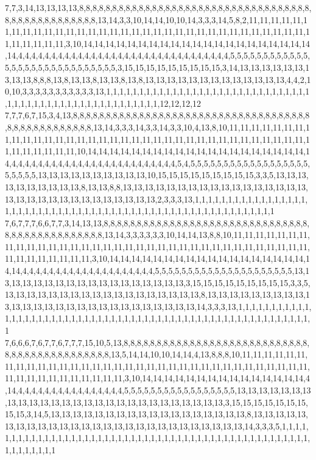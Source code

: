 7,7,3,14,13,13,13,13,8,8,8,8,8,8,8,8,8,8,8,8,8,8,8,8,8,8,8,8,8,8,8,8,8,8,8,8,8,8,8,8,8,8,8,8,8,8,8,8,8,8,8,8,8,8,8,8,8,13,14,3,3,10,14,14,10,10,14,3,3,3,14,5,8,2,11,11,11,11,11,11,11,11,11,11,11,11,11,11,11,11,11,11,11,11,11,11,11,11,11,11,11,11,11,11,11,11,11,11,11,11,11,11,11,3,10,14,14,14,14,14,14,14,14,14,14,14,14,14,14,14,14,14,14,14,14,14,14,4,4,4,4,4,4,4,4,4,4,4,4,4,4,4,4,4,4,4,4,4,4,4,4,4,4,4,4,4,4,4,4,5,5,5,5,5,5,5,5,5,5,5,5,5,5,5,5,5,5,5,5,5,5,5,5,5,5,5,5,5,3,15,15,15,15,15,15,15,15,15,3,14,13,13,13,13,13,13,13,13,13,8,8,8,13,8,13,13,8,13,13,8,13,8,13,13,13,13,13,13,13,13,13,13,13,13,13,4,4,2,10,10,3,3,3,3,3,3,3,3,3,3,3,13,1,1,1,1,1,1,1,1,1,1,1,1,1,1,1,1,1,1,1,1,1,1,1,1,1,1,1,1,1,1,1,1,1,1,1,1,1,1,1,1,1,1,1,1,1,1,1,1,1,1,1,1,1,1,12,12,12,12
7,7,7,6,7,15,3,4,13,8,8,8,8,8,8,8,8,8,8,8,8,8,8,8,8,8,8,8,8,8,8,8,8,8,8,8,8,8,8,8,8,8,8,8,8,8,8,8,8,8,8,8,8,8,8,8,8,8,13,14,3,3,3,14,3,3,14,3,3,10,4,13,8,10,11,11,11,11,11,11,11,11,11,11,11,11,11,11,11,11,11,11,11,11,11,11,11,11,11,11,11,11,11,11,11,11,11,11,11,11,11,11,11,11,11,11,10,14,14,14,14,14,14,14,14,14,14,14,14,14,14,14,14,14,14,14,14,14,4,4,4,4,4,4,4,4,4,4,4,4,4,4,4,4,4,4,4,4,4,4,4,4,4,5,4,5,5,5,5,5,5,5,5,5,5,5,5,5,5,5,5,5,5,5,5,5,5,5,13,13,13,13,13,13,13,13,13,13,10,15,15,15,15,15,15,15,15,15,3,3,5,13,13,13,13,13,13,13,13,13,13,8,13,13,8,8,13,13,13,13,13,13,13,13,13,13,13,13,13,13,13,13,13,13,13,13,13,13,13,13,13,13,13,13,13,13,13,2,3,3,3,13,1,1,1,1,1,1,1,1,1,1,1,1,1,1,1,1,1,1,1,1,1,1,1,1,1,1,1,1,1,1,1,1,1,1,1,1,1,1,1,1,1,1,1,1,1,1,1,1,1,1,1,1,1,1,1,1,1,1
7,6,7,7,7,6,6,7,7,3,14,13,13,8,8,8,8,8,8,8,8,8,8,8,8,8,8,8,8,8,8,8,8,8,8,8,8,8,8,8,8,8,8,8,8,8,8,8,8,8,8,8,8,8,8,8,8,8,8,13,14,3,3,3,3,3,3,10,14,14,13,8,8,10,11,11,11,11,11,11,11,11,11,11,11,11,11,11,11,11,11,11,11,11,11,11,11,11,11,11,11,11,11,11,11,11,11,11,11,11,11,11,11,11,11,11,11,3,10,14,14,14,14,14,14,14,14,14,14,14,14,14,14,14,14,14,14,14,14,4,4,4,4,4,4,4,4,4,4,4,4,4,4,4,4,4,4,4,4,5,5,5,5,5,5,5,5,5,5,5,5,5,5,5,5,5,5,5,5,5,13,13,13,13,13,13,13,13,13,13,13,13,13,13,13,13,13,13,3,15,15,15,15,15,15,15,15,15,3,3,5,13,13,13,13,13,13,13,13,13,13,13,13,13,13,13,13,13,13,8,13,13,13,13,13,13,13,13,13,13,13,13,13,13,13,13,13,13,13,13,13,13,13,13,13,13,13,14,3,3,3,13,1,1,1,1,1,1,1,1,1,1,1,1,1,1,1,1,1,1,1,1,1,1,1,1,1,1,1,1,1,1,1,1,1,1,1,1,1,1,1,1,1,1,1,1,1,1,1,1,1,1,1,1,1,1,1,1,1,1
7,6,6,6,7,6,7,7,6,7,7,7,15,10,5,13,8,8,8,8,8,8,8,8,8,8,8,8,8,8,8,8,8,8,8,8,8,8,8,8,8,8,8,8,8,8,8,8,8,8,8,8,8,8,8,8,8,8,8,8,13,5,14,14,10,10,14,14,4,13,8,8,8,10,11,11,11,11,11,11,11,11,11,11,11,11,11,11,11,11,11,11,11,11,11,11,11,11,11,11,11,11,11,11,11,11,11,11,11,11,11,11,11,11,11,11,11,11,11,3,10,14,14,14,14,14,14,14,14,14,14,14,14,14,14,14,4,14,4,4,4,4,4,4,4,4,4,4,4,4,4,4,4,4,5,5,5,5,5,5,5,5,5,5,5,5,5,5,5,5,5,13,13,13,13,13,13,13,13,13,13,13,13,13,13,13,13,13,13,13,13,13,13,13,13,13,13,13,3,15,15,15,15,15,15,15,15,15,3,14,5,13,13,13,13,13,13,13,13,13,13,13,13,13,13,13,13,13,13,8,13,13,13,13,13,13,13,13,13,13,13,13,13,13,13,13,13,13,13,13,13,13,13,13,13,13,13,14,3,3,3,5,1,1,1,1,1,1,1,1,1,1,1,1,1,1,1,1,1,1,1,1,1,1,1,1,1,1,1,1,1,1,1,1,1,1,1,1,1,1,1,1,1,1,1,1,1,1,1,1,1,1,1,1,1,1,1,1,1,1
